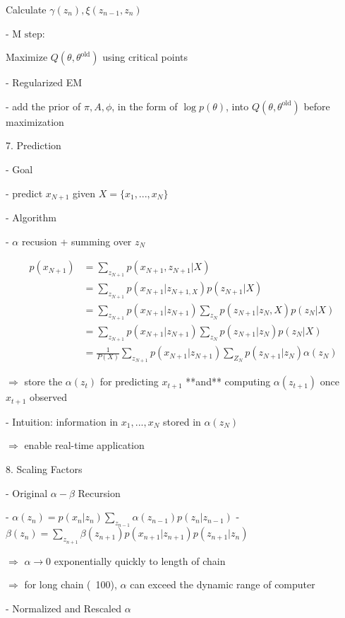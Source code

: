        Calculate $\gamma(z_n), \xi(z_{n-1}, z_n)$ 

     - $\text{M step:}$ 

       Maximize $Q(\theta,\theta^{\text{old}})$ using critical points

   - Regularized EM

     - add the prior of $\pi, A, \phi$, in the form of $\log p(\theta)$, into $Q(\theta,\theta^\text{old})$ before maximization

7. Prediction

   - Goal

     - predict $x_{N+1}$ given $X=\{x_1,...,x_N\}$ 

   - Algorithm

     - $\alpha$ recusion + summing over $z_N$

       \begin{align} \displaystyle p(x_{N+1}) &= \sum_{z_{N+1}} p(x_{N+1}, z_{N+1}|X) \\ &= \sum_{z_{N+1}} p(x_{N+1}|z_{N+1,X})p(z_{N+1}|X) \\ &= \sum_{z_{N+1}} p(x_{N+1} | z_{N+1}) \sum_{z_N} p(z_{N+1}|z_N,X)p(z_N|X) \\ &= \sum_{z_{N+1}} p(x_{N+1}|z_{N+1}) \sum_{z_N} p(z_{N+1}|z_N)p(z_N|X) \\ &= \frac 1 {P(X)}\sum_{z_{N+1}} p(x_{N+1}| z_{N+1}) \sum_{Z_{N}} p(z_{N+1}|z_N) \alpha(z_N) \end{align}

       $\Rightarrow$ store the $\alpha(z_t)$ for predicting $x_{t+1}$ **and** computing $\alpha(z_{t+1})$ once $x_{t+1}$ observed

     - Intuition: information in $x_1,...,x_N$ stored in $\alpha(z_N)$ 

       $\Rightarrow$ enable real-time application

8. Scaling Factors

   - Original $\alpha-\beta$ Recursion

     - $\displaystyle \alpha(z_n) =  p(x_n|z_n) \sum_{z_{n-1}}\alpha(z_{n-1}) p(z_n|z_{n-1})$
     - $\displaystyle \beta(z_n) =  \sum_{z_{n+1}} \beta(z_{n+1}) p(x_{n+1} | z_{n+1}) p(z_{n+1}|z_n)$ 

     $\Rightarrow$ $\alpha\rightarrow 0$ exponentially quickly to length of chain

     $\Rightarrow$ for long chain (~100), $\alpha$ can exceed the dynamic range of computer

   - Normalized and Rescaled $\alpha$ 

